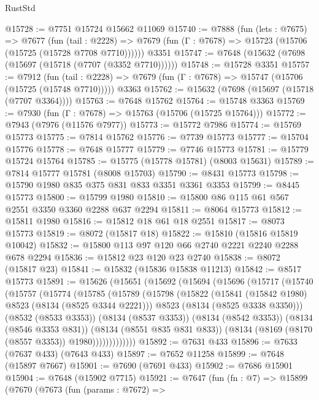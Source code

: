\begin{lexlean}{RustStd}
\begin{coremodule}
@15728 := @7751 @15724 @15662 @11069
@15740 := @7888
    (fun (lets : @7675) =>
    @7677
      (fun (tail : @2228) =>
      @7679 (fun (Γ : @7678) => @15723 (@15706 (@15725 (@15728 @7708 @7710))))))
    @3351
@15747 := @7648 (@15632 (@7698 (@15697 (@15718 (@7707 (@3352 @7710))))))
@15748 := @15728 @3351
@15757 := @7912
    (fun (tail : @2228) => @7679 (fun (Γ : @7678) => @15747 (@15706 (@15725 (@15748 @7710)))))
    @3363
@15762 := @15632 (@7698 (@15697 (@15718 (@7707 @3364))))
@15763 := @7648 @15762
@15764 := @15748 @3363
@15769 := @7930 (fun (Γ : @7678) => @15763 (@15706 (@15725 @15764)))
@15772 := @7943 (@7976 (@11576 @7977))
@15773 := @15772 @7986
@15774 := @15769 @15773
@15775 := @7814 @15762
@15776 := @7739 @15773
@15777 := @15704 @15776
@15778 := @7648 @15777
@15779 := @7746 @15773
@15781 := @15779 @15724 @15764
@15785 := @15775 (@15778 @15781) (@8003 @15631)
@15789 := @7814 @15777 @15781 (@8008 @15703)
@15790 := @8431 @15773
@15798 := @15790 @1980 @835 @375 @831 @833 @3351 @3361 @3353
@15799 := @8445 @15773
@15800 := @15799 @1980
@15810 := @15800 @86 @115 @61 @567 @2551 @3350 @3360 @2288 @637 @2294
@15811 := @8064 @15773
@15812 := @15811 @1980
@15816 := @15812 @18 @61 @18 @2551
@15817 := @8073 @15773
@15819 := @8072 (@15817 @18)
@15822 := @15810 (@15816 @15819 @10042)
@15832 := @15800 @113 @97 @120 @66 @2740 @2221 @2240 @2288 @678 @2294
@15836 := @15812 @23 @120 @23 @2740
@15838 := @8072 (@15817 @23)
@15841 := @15832 (@15836 @15838 @11213)
@15842 := @8517 @15773
@15891 := @15626
    (@15651
      (@15692
        (@15694
          (@15696
            (@15717
              (@15740
                (@15757
                  (@15774
                    (@15785
                      (@15789
                        (@15798
                          (@15822
                            (@15841 (@15842 @1980) @8523 (@8134 (@8525 @3344 @2221)))
                            @8523
                            (@8134 (@8525 @3338 @3350)))
                          (@8532 (@8533 @3353))
                          (@8134 (@8537 @3353))
                          (@8134 (@8542 @3353))
                          (@8134 (@8546 @3353 @831))
                          (@8134 (@8551 @835 @831 @833))
                          (@8134 (@8169 (@8170 (@8557 @3353)) @1980)))))))))))))
@15892 := @7631 @433
@15896 := @7633 (@7637 @433) (@7643 @433)
@15897 := @7652 @11258
@15899 := @7648 (@15897 @7667)
@15901 := @7690 (@7691 @433)
@15902 := @7686 @15901
@15904 := @7648 (@15902 @7715)
@15921 := @7647
    (fun (fn : @7) =>
    @15899
      (@7670
        (@7673
          (fun (params : @7672) =>

\end{coremodule}
\end{lexlean}
